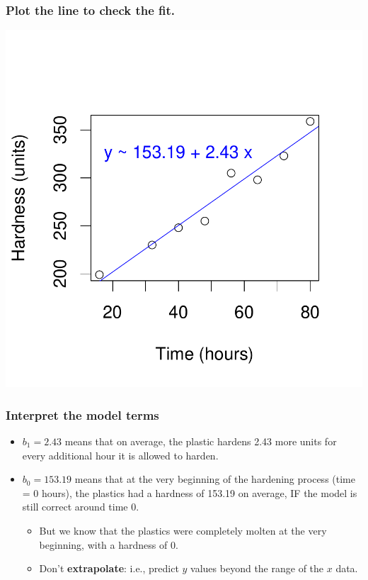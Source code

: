 \documentclass[handout]{beamer}
\numberwithin{equation}{section}
\begin{document}
\begin{frame}
\frametitle{Plot the line to check the fit.} \small
\begin{center}
\includegraphics{ch4part1-008}

\end{center}
\end{frame}

\begin{frame}
\frametitle{Interpret the model terms}
\begin{itemize}
\pause \item $b_1 = 2.43$ means that on average, the plastic hardens 2.43 more units for every additional hour it is allowed to harden.
\pause \item $b_0 = 153.19$ means that at the very beginning of the hardening process (time = 0 hours), the plastics had a hardness of 153.19 on average, IF the model is still correct around time 0.
\begin{itemize}
\pause \item But we know that the plastics were completely molten at the very beginning, with a hardness of 0.
\pause \item Don't {\bf extrapolate}: i.e., predict $y$ values beyond the range of the $x$ data.
\end{itemize}
\end{itemize}
\end{frame}
\end{document}
